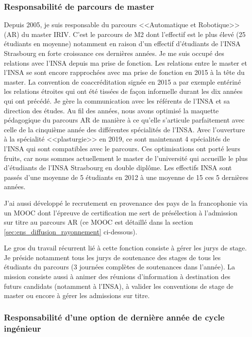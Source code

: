 \documentclass[a4paper,12pt]{article}
\begin{document}
\subsubsection{Responsabilité de parcours de master}

Depuis 2005, je suis responsable du parcours <<Automatique et Robotique>> (AR) du master IRIV. C’est le parcours de M2 dont l’effectif est le plus élevé (25 étudiants en moyenne) notamment en raison d’un effectif d’étudiants de l’INSA Strasbourg en forte croissance ces dernières années. Je me suis occupé des relations avec l’INSA depuis ma prise de fonction. Les relations entre le master et l'INSA se sont encore rapprochées avec ma prise de fonction en 2015 à la tête du master. La convention de coaccréditation signée en 2015 a par exemple entériné les relations étroites qui ont été tissées de façon informelle durant les dix années qui ont précédé. Je gère la communication avec les référents de l’INSA et sa direction des études. Au fil des années, nous avons optimisé la maquette pédagogique du parcours AR de manière à ce qu’elle s’articule parfaitement avec celle de la cinquième année des différentes spécialités de l’INSA. Avec l'ouverture à la spécialité <<plasturgie>> en 2019, ce sont maintenant 4 spécialités de l'INSA qui sont compatibles avec le parcours. Ces optimisations ont porté leurs fruits, car nous sommes actuellement le master de l’université qui accueille le plus d’étudiants de l’INSA Strasbourg en double diplôme. Les effectifs INSA sont passés d'une moyenne de 5 étudiants en 2012 à une moyenne de 15 ces 5 dernières années.

J’ai aussi développé le recrutement en provenance des pays de la francophonie via un MOOC dont l’épreuve de certification me sert de présélection à l’admission sur titre au parcours AR (ce MOOC est détaillé dans la section \ref{sec:ens_diffusion_rayonnement} ci-dessous).

Le gros du travail récurrent lié à cette fonction consiste à gérer les jurys de stage. Je préside notamment tous les jurys de soutenance des stages de tous les étudiants du parcours (3 journées complètes de soutenances dans l’année). La mission consiste aussi à animer des réunions d'information à destination des futurs candidats (notamment à l'INSA), à valider les conventions de stage de master ou encore à gérer les admissions sur titre.

\subsubsection{Responsabilité d'une option de dernière année de cycle ingénieur}
\end{document}
